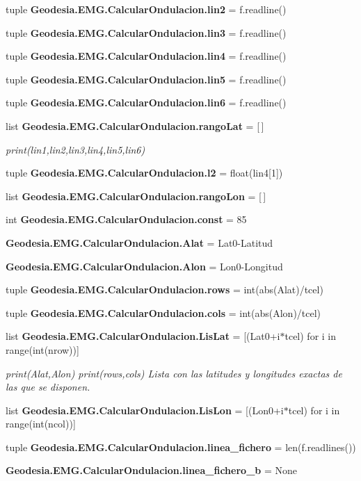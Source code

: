 \begin{DoxyCompactItemize}
tuple {\bf Geodesia.\-E\-M\-G.\-Calcular\-Ondulacion.\-lin2} = f.\-readline()
\item 
tuple {\bf Geodesia.\-E\-M\-G.\-Calcular\-Ondulacion.\-lin3} = f.\-readline()
\item 
tuple {\bf Geodesia.\-E\-M\-G.\-Calcular\-Ondulacion.\-lin4} = f.\-readline()
\item 
tuple {\bf Geodesia.\-E\-M\-G.\-Calcular\-Ondulacion.\-lin5} = f.\-readline()
\item 
tuple {\bf Geodesia.\-E\-M\-G.\-Calcular\-Ondulacion.\-lin6} = f.\-readline()
\item 
list {\bf Geodesia.\-E\-M\-G.\-Calcular\-Ondulacion.\-rango\-Lat} = [$\,$]
\begin{DoxyCompactList}\small\item\em print(lin1,lin2,lin3,lin4,lin5,lin6) \end{DoxyCompactList}\item 
tuple {\bf Geodesia.\-E\-M\-G.\-Calcular\-Ondulacion.\-l2} = float(lin4[1])
\item 
list {\bf Geodesia.\-E\-M\-G.\-Calcular\-Ondulacion.\-rango\-Lon} = [$\,$]
\item 
int {\bf Geodesia.\-E\-M\-G.\-Calcular\-Ondulacion.\-const} = 85
\item 
{\bf Geodesia.\-E\-M\-G.\-Calcular\-Ondulacion.\-Alat} = Lat0-\/Latitud
\item 
{\bf Geodesia.\-E\-M\-G.\-Calcular\-Ondulacion.\-Alon} = Lon0-\/Longitud
\item 
tuple {\bf Geodesia.\-E\-M\-G.\-Calcular\-Ondulacion.\-rows} = int(abs(Alat)/tcel)
\item 
tuple {\bf Geodesia.\-E\-M\-G.\-Calcular\-Ondulacion.\-cols} = int(abs(Alon)/tcel)
\item 
list {\bf Geodesia.\-E\-M\-G.\-Calcular\-Ondulacion.\-Lis\-Lat} = [(Lat0+i$\ast$tcel) for i in range(int(nrow))]
\begin{DoxyCompactList}\small\item\em print(\-Alat,\-Alon) print(rows,cols) Lista con las latitudes y longitudes exactas de las que se disponen. \end{DoxyCompactList}\item 
list {\bf Geodesia.\-E\-M\-G.\-Calcular\-Ondulacion.\-Lis\-Lon} = [(Lon0+i$\ast$tcel) for i in range(int(ncol))]
\item 
tuple {\bf Geodesia.\-E\-M\-G.\-Calcular\-Ondulacion.\-linea\-\_\-fichero} = len(f.\-readlines())
\item 
{\bf Geodesia.\-E\-M\-G.\-Calcular\-Ondulacion.\-linea\-\_\-fichero\-\_\-b} = None

\end{DoxyCompactItemize}
